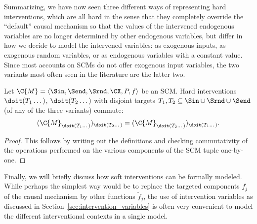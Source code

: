 Summarizing, we have now seen three different ways of representing hard interventions,
which are all hard in the sense that they completely override the ``default''
causal mechanism so that the values of the intervened endogenous variables are
no longer determined by other endogenous variables, but differ in how we decide
to model the intervened variables: as exogenous inputs, as exogenous random
variables, or as endogenous variables with a constant value.
Since most accounts on SCMs do not offer exogenous input variables, the two variants 
most often seen in the literature are the latter two.

%
\begin{Prp}\label{prp:hard_interventions_commute}
Let $\C{M} = \langle \Sin, \Send, \Srnd, \CX, P, f \rangle$ be an SCM.
Hard interventions $\doit(T_1\dots)$, $\doit(T_2\dots)$ with disjoint targets $T_1, T_2 \subseteq \Sin \cup \Srnd \cup \Send$ (of any of the three variants) commute:
  $$(\C{M}_{\doit(T_1\dots)})_{\doit(T_2\dots)} = (\C{M}_{\doit(T_2\dots)})_{\doit(T_1\dots)}.$$
\end{Prp}
\begin{proof}
  This follows by writing out the definitions and checking commutativity of
  the operations performed on the various components of the SCM tuple one-by-one.
\end{proof}

Finally, we will briefly discuss how soft interventions can be formally modeled.
While perhaps the simplest way would be to replace the targeted components $f_j$ of the
causal mechanism by other functions $\tilde f_j$, the use of intervention variables as
discussed in Section~\ref{sec:intervention_variables} is often very convenient to
model the different interventional contexts in a single model.

